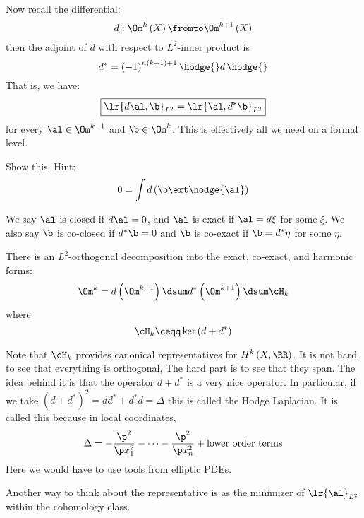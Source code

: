 \documentclass{amsart}
\begin{document}
Now recall the differential:
\begin{equation}
d: \Om^k\left( X \right) \fromto \Om^{k+1}\left( X \right)
\end{equation}
then the adjoint of $d$ with respect to $L^2$-inner product is 
\begin{equation}
d^* = \left( -1 \right)^{n\left( k+1 \right) + 1} \hodge{} d \, \hodge{}
\end{equation}
That is, we have:
\begin{equation}
\boxed{
\lr{d \al , \b}_{L^2} = \lr{\al , d^* \b}_{L^2}}
\end{equation}
for every $\al \in \Om^{k-1}$ and $\b \in \Om^k$.
This is effectively all we need on a formal level.
\begin{exr}
Show this.
Hint:
\begin{equation}
0 = \int d\left( \b \ext \hodge{\al} \right)
\end{equation}
\end{exr}

We say $\al$ is closed if $d\al = 0$, and $\al$ is exact if $\al = d \xi$ for some $\xi$.
We also say $\b$ is co-closed if $d^* \b = 0$ and $\b$ is co-exact if $\b = d^*\eta$ for
some $\eta$.

\begin{thm}[Hodge]
There is an $L^2$-orthogonal decomposition into the exact, co-exact, and harmonic forms:
\begin{equation}
\Om^k = 
d\left( \Om^{k-1} \right) 
\dsum d^* \left( \Om^{k+1} \right)
\dsum \cH_k
\end{equation}
where
\begin{equation}
\cH_k \ceqq \ker \left( d + d^* \right)
\end{equation}
\end{thm}

Note that $\cH_k$ provides canonical representatives for $H^k\left( X , \RR \right)$.
It is not hard to see that everything is orthogonal,
The hard part is to see that they span.
The idea behind it is that the operator $d + d^*$ is a very nice operator. 
In particular, if we take $\left( d + d^* \right)^2 = d d^* + d^* d = \Delta$
this is called the Hodge Laplacian. 
It is called this because in local coordinates, 
\begin{equation}
\Delta = -\frac{\p^2}{\p x_1^2} - \cdots - \frac{\p^2}{\p x_n^2} + \text{lower order terms}
\end{equation}
Here we would have to use tools from elliptic PDEs.

Another way to think about the representative is as the minimizer of 
$\lr{\al}_{L^2}$ within the cohomology class.
\end{document}
